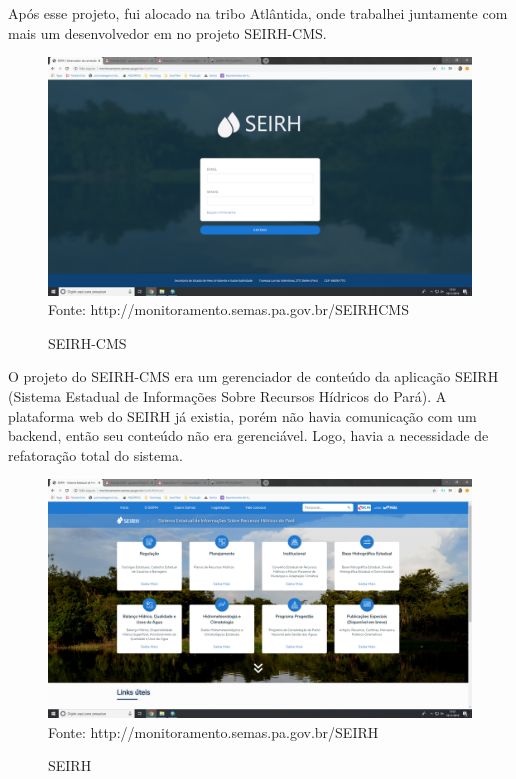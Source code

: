 Após esse projeto, fui alocado na tribo Atlântida, onde trabalhei juntamente com mais um desenvolvedor em no projeto SEIRH-CMS.

\begin{figure}[H]
\centering
\caption{SEIRH-CMS} %
\includegraphics[scale=0.22]{SEIRH-CMS}\\  %
{\small Fonte: http://monitoramento.semas.pa.gov.br/SEIRHCMS} %
\label{fig:exemplo} %
\end{figure}

O projeto do SEIRH-CMS era um gerenciador de conteúdo da aplicação SEIRH (Sistema Estadual de Informações Sobre Recursos Hídricos do Pará).
A plataforma web do SEIRH já existia, porém não havia comunicação com um backend, então seu conteúdo não era gerenciável. Logo, havia a necessidade de refatoração total do sistema.

\begin{figure}[H]
\centering
\caption{SEIRH} %
\includegraphics[scale=0.22]{SEIRH}\\  %
{\small Fonte: http://monitoramento.semas.pa.gov.br/SEIRH} %
\label{fig:exemplo} %
\end{figure}

